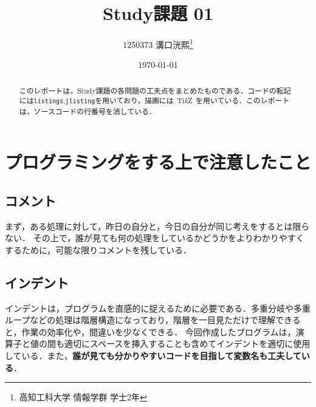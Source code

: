 \documentclass[a4j,11pt]{jsarticle}
\title{\vspace{0cm}Study課題 01}
\author{1250373 溝口洸熙\thanks{高知工科大学 情報学群 学士2年}}
\date{\today}
\begin{document}
\maketitle
\begin{abstract}
    このレポートは，Study課題の各問題の工夫点をまとめたものである．コードの転記には\verb|listings|,\verb|jlisting|を用いており，描画には\ Ti\emph{k}\normalfont Z\ を用いている．このレポートは，ソースコードの行番号を消している．
\end{abstract}

\section*{プログラミングをする上で注意したこと}
\subsection{コメント}
まず，ある処理に対して，昨日の自分と，今日の自分が同じ考えをするとは限らない．
その上で，誰が見ても何の処理をしているかどうかをよりわかりやすくするために，可能な限りコメントを残している．
\subsection{インデント}
インデントは，プログラムを直感的に捉えるために必要である．多重分岐や多重ループなどの処理は階層構造になっており，階層を一目見ただけで理解できると，作業の効率化や，間違いを少なくできる．
今回作成したプログラムは，演算子と値の間も適切にスペースを挿入することも含めてインデントを適切に使用している．また，\textbf{誰が見ても分かりやすいコードを目指して変数名も工夫している}．
\end{document}
